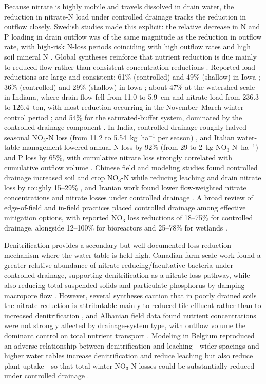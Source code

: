 \documentclass[11pt]{article}
\begin{document}
Because nitrate is highly mobile and travels dissolved in drain water, the
reduction in nitrate-N load under controlled drainage tracks the reduction in
outflow closely. Swedish studies made this explicit: the relative decrease in N
and P loading in drain outflow was of the same magnitude as the reduction in
outflow rate, with high-risk N-loss periods coinciding with high outflow rates
and high soil mineral N \parencite{Wesström2007}. Global syntheses reinforce
that nutrient reduction is due mainly to reduced flow rather than consistent
concentration reductions \parencite{Frankenberger2024,Wang2020c}. Reported
load reductions are large and consistent: 61\% (controlled) and 49\% (shallow)
in Iowa \parencite{Schott2017}; 36\% (controlled) and 29\% (shallow) in Iowa
\parencite{Helmers2012}; about 47\% at the watershed scale in Indiana, where
drain flow fell from 11.0 to 5.9~cm and nitrate load from 236.3 to 126.4~ton,
with most reduction occurring in the November--March winter control period
\parencite{Ale2012}; and 54\% for the saturated-buffer system, dominated by the
controlled-drainage component \parencite{Ghane2025}. In India, controlled
drainage roughly halved seasonal NO$_3$-N loss (from 11.2 to
5.54~kg~ha$^{-1}$ per season) \parencite{Karegoudar2019}, and Italian water-table
management lowered annual N loss by 92\% (from 29 to 2~kg NO$_3$-N~ha$^{-1}$) and
P loss by 65\%, with cumulative nitrate loss strongly correlated with cumulative
outflow volume \parencite{Tolomio2018}. Chinese field and modeling studies found
controlled drainage increased soil and crop NO$_3$-N while reducing leaching and
drain nitrate loss by roughly 15--29\% \parencite{Dou2021,Dou2023}, and Iranian
work found lower flow-weighted nitrate concentrations and nitrate losses under
controlled drainage \parencite{Jouni2018}. A broad review of edge-of-field and
in-field practices placed controlled drainage among effective mitigation
options, with reported NO$_3$ loss reductions of 18--75\% for controlled
drainage, alongside 12--100\% for bioreactors and 25--78\% for wetlands
\parencite{Castellano2019}.

Denitrification provides a secondary but well-documented loss-reduction
mechanism where the water table is held high. Canadian farm-scale work found a
greater relative abundance of nitrate-reducing/facultative bacteria under
controlled drainage, supporting denitrification as a nitrate-loss pathway, while
also reducing total suspended solids and particulate phosphorus by damping
macropore flow \parencite{Tanga2025}. However, several syntheses caution that in
poorly drained soils the nitrate reduction is attributable mainly to reduced
tile effluent rather than to increased denitrification \parencite{THOMAS1995},
and Albanian field data found nutrient concentrations were not strongly affected
by drainage-system type, with outflow volume the dominant control on total
nutrient transport \parencite{Grazhdani1996}. Modeling in Belgium reproduced an
adverse relationship between denitrification and leaching---wider spacings and
higher water tables increase denitrification and reduce leaching but also reduce
plant uptake---so that total winter NO$_3$-N losses could be substantially
reduced under controlled drainage \parencite{ElSadek2002,ElSadek2002b}.
\end{document}
